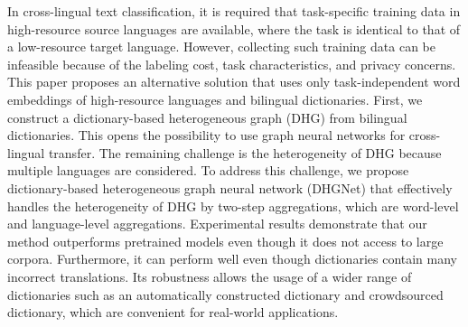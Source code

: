 In cross-lingual text classification, it is required that task-specific training data in high-resource source languages are available, where the task is identical to that of a low-resource target language. However, collecting such training data can be infeasible because of the labeling cost, task characteristics, and privacy concerns. This paper proposes an alternative solution that uses only task-independent word embeddings of high-resource languages and bilingual dictionaries. First, we construct a dictionary-based heterogeneous graph (DHG) from bilingual dictionaries. This opens the possibility to use graph neural networks for cross-lingual transfer. The remaining challenge is the heterogeneity of DHG because multiple languages are considered. To address this challenge, we propose dictionary-based heterogeneous graph neural network (DHGNet) that effectively handles the heterogeneity of DHG by two-step aggregations, which are word-level and language-level aggregations. Experimental results demonstrate that our method outperforms pretrained models even though it does not access to large corpora.  Furthermore, it can perform well even though dictionaries contain many incorrect translations. Its robustness allows the usage of a wider range of dictionaries such as an automatically constructed dictionary and crowdsourced dictionary, which are convenient for real-world applications.
